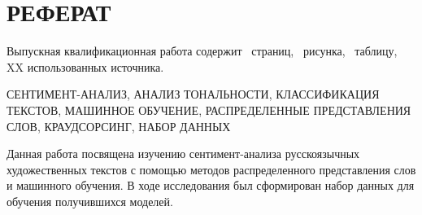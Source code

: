 \chapter*{РЕФЕРАТ}









%
%

\bigskip\par
Выпускная квалификационная работа содержит \pageref*{LastPage}~страниц, \totfig~рисунка,                                        \tottab~таблицу, XX использованных источника.

\bigskip\par
СЕНТИМЕНТ-АНАЛИЗ, АНАЛИЗ ТОНАЛЬНОСТИ, КЛАССИФИКАЦИЯ ТЕКСТОВ, МАШИННОЕ ОБУЧЕНИЕ, РАСПРЕДЕЛЕННЫЕ ПРЕДСТАВЛЕНИЯ СЛОВ, КРАУДСОРСИНГ, НАБОР ДАННЫХ

\bigskip\par
Данная работа посвящена изучению сентимент-анализа русскоязычных художественных текстов с помощью методов распределенного представления слов и машинного обучения. В ходе исследования был сформирован набор данных для обучения получившихся моделей.


